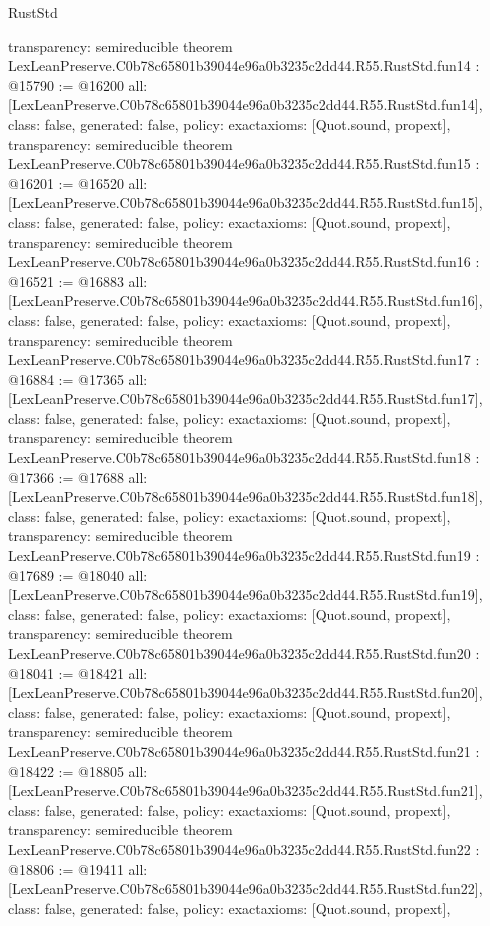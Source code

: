 \begin{lexlean}{RustStd}
\begin{coremodule}
{  transparency: semireducible
}
theorem LexLeanPreserve.C0b78c65801b39044e96a0b3235c2dd44.R55.RustStd.fun14 : @15790 := @16200 {
  all: [LexLeanPreserve.C0b78c65801b39044e96a0b3235c2dd44.R55.RustStd.fun14],
  class: false,
  generated: false,
  policy: exact{axioms: [Quot.sound, propext]},
  transparency: semireducible
}
theorem LexLeanPreserve.C0b78c65801b39044e96a0b3235c2dd44.R55.RustStd.fun15 : @16201 := @16520 {
  all: [LexLeanPreserve.C0b78c65801b39044e96a0b3235c2dd44.R55.RustStd.fun15],
  class: false,
  generated: false,
  policy: exact{axioms: [Quot.sound, propext]},
  transparency: semireducible
}
theorem LexLeanPreserve.C0b78c65801b39044e96a0b3235c2dd44.R55.RustStd.fun16 : @16521 := @16883 {
  all: [LexLeanPreserve.C0b78c65801b39044e96a0b3235c2dd44.R55.RustStd.fun16],
  class: false,
  generated: false,
  policy: exact{axioms: [Quot.sound, propext]},
  transparency: semireducible
}
theorem LexLeanPreserve.C0b78c65801b39044e96a0b3235c2dd44.R55.RustStd.fun17 : @16884 := @17365 {
  all: [LexLeanPreserve.C0b78c65801b39044e96a0b3235c2dd44.R55.RustStd.fun17],
  class: false,
  generated: false,
  policy: exact{axioms: [Quot.sound, propext]},
  transparency: semireducible
}
theorem LexLeanPreserve.C0b78c65801b39044e96a0b3235c2dd44.R55.RustStd.fun18 : @17366 := @17688 {
  all: [LexLeanPreserve.C0b78c65801b39044e96a0b3235c2dd44.R55.RustStd.fun18],
  class: false,
  generated: false,
  policy: exact{axioms: [Quot.sound, propext]},
  transparency: semireducible
}
theorem LexLeanPreserve.C0b78c65801b39044e96a0b3235c2dd44.R55.RustStd.fun19 : @17689 := @18040 {
  all: [LexLeanPreserve.C0b78c65801b39044e96a0b3235c2dd44.R55.RustStd.fun19],
  class: false,
  generated: false,
  policy: exact{axioms: [Quot.sound, propext]},
  transparency: semireducible
}
theorem LexLeanPreserve.C0b78c65801b39044e96a0b3235c2dd44.R55.RustStd.fun20 : @18041 := @18421 {
  all: [LexLeanPreserve.C0b78c65801b39044e96a0b3235c2dd44.R55.RustStd.fun20],
  class: false,
  generated: false,
  policy: exact{axioms: [Quot.sound, propext]},
  transparency: semireducible
}
theorem LexLeanPreserve.C0b78c65801b39044e96a0b3235c2dd44.R55.RustStd.fun21 : @18422 := @18805 {
  all: [LexLeanPreserve.C0b78c65801b39044e96a0b3235c2dd44.R55.RustStd.fun21],
  class: false,
  generated: false,
  policy: exact{axioms: [Quot.sound, propext]},
  transparency: semireducible
}
theorem LexLeanPreserve.C0b78c65801b39044e96a0b3235c2dd44.R55.RustStd.fun22 : @18806 := @19411 {
  all: [LexLeanPreserve.C0b78c65801b39044e96a0b3235c2dd44.R55.RustStd.fun22],
  class: false,
  generated: false,
  policy: exact{axioms: [Quot.sound, propext]},
}
\end{coremodule}
\end{lexlean}
